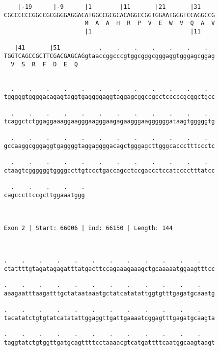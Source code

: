 \documentclass{article}
\begin{document}
\begin{Verbatim}
    |-19      |-9      |1        |11       |21       |31    
CGCCCCCCGGCCGCGGGGAGGACATGGCCGCGCACAGGCCGGTGGAATGGGTCCAGGCCG
                       M  A  A  H  R  P  V  E  W  V  Q  A  V
                       |1                            |11    
  
   |41       |51           .    .    .    .    .    .    .  
TGGTCAGCCGCTTCGACGAGCAGgtaaccggcccgtggcgggcgggaggtgggagcggag
  V  S  R  F  D  E  Q                                       
                                                            
  
  .    .    .    .    .    .    .    .    .    .    .    .  
tgggggtggggacagagtaggtgaggggaggtaggagcggccgcctcccccgcggctgcc
                                                            
  .    .    .    .    .    .    .    .    .    .    .    .  
tcaggctctggaggaaaggaagggaagggaagagaagggaaggggggataagtgggggtg
                                                            
  .    .    .    .    .    .    .    .    .    .    .    .  
gccaaggcgggaggtgaggggtaggaggggacagctgggagcttgggcaccctttccctc
                                                            
  .    .    .    .    .    .    .    .    .    .    .    .  
ctaagtcggggggtggggccttgtccctgaccagcctccgaccctccatcccctttatcc
                                                            
  .    .    .    .    .
cagcccttccgcttggaaatggg
                       
                       
 
Exon 2 | Start: 66006 | End: 66150 | Length: 144



.    .    .    .    .    .    .    .    .    .    .    .    
ctattttgtagatagagatttatgacttccagaaagaaagctgcaaaaatggaagtttcc
                                                            
.    .    .    .    .    .    .    .    .    .    .    .    
aaagaatttaagatttgctataataaatgctatcatatattggtgtttgagatgcaaatg
                                                            
.    .    .    .    .    .    .    .    .    .    .    .    
tacatatctgtgtatcatatattggaggttgattgaaaatcggagtttgagatgcaagta
                                                            
.    .    .    .    .    .    .    .    .    .    .    .    
taggtatctgtggttgatgcagttttcctaaaacgtcatgattttcaatggcaagtaagt
                                                            

\end{Verbatim}
\end{document}
